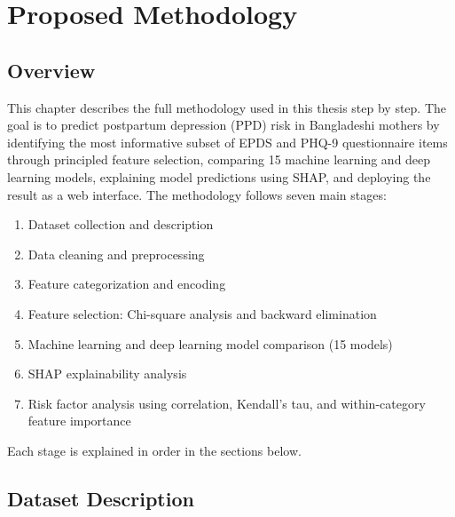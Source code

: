 

\chapter{Proposed Methodology}
\label{ch:methodology}

\section{Overview}
\label{ch3-sec-intro}

This chapter describes the full methodology used in this thesis step by step. The goal is to predict postpartum depression (PPD) risk in Bangladeshi mothers by identifying the most informative subset of EPDS and PHQ-9 questionnaire items through principled feature selection, comparing 15 machine learning and deep learning models, explaining model predictions using SHAP, and deploying the result as a web interface. The methodology follows seven main stages:

\begin{enumerate}
    \item Dataset collection and description
    \item Data cleaning and preprocessing
    \item Feature categorization and encoding
    \item Feature selection: Chi-square analysis and backward elimination
    \item Machine learning and deep learning model comparison (15 models)
    \item SHAP explainability analysis
    \item Risk factor analysis using correlation, Kendall's tau, and within-category feature importance
\end{enumerate}

Each stage is explained in order in the sections below.

\section{Dataset Description}
\label{ch3-sec-dataset}

